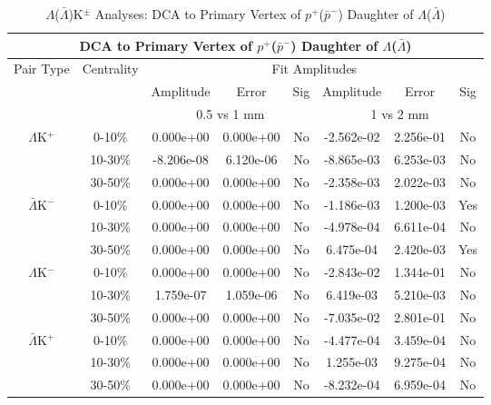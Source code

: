 \documentclass[../AnalysisNoteJBuxton.tex]{subfiles}
\begin{document}
\clearpage




\begin{table}
 \centering
 \begin{tabular}{|c|c|c|c|c||c|c|c|}
  \multicolumn{8}{c}{DCA to Primary Vertex of $p^{+}$($\bar{p}^{-}$) Daughter of $\Lambda$($\bar{\Lambda}$)} \\
  \hline
  \multirow{3}{*}{Pair Type} & \multirow{3}{*}{Centrality} & \multicolumn{6}{c|}{Fit Amplitudes} \\
  \cline{3-8}
   & & Amplitude & Error & Sig & Amplitude & Error & Sig \\  
  \cline{3-8}
   & & \multicolumn{3}{c||}{0.5 vs 1 mm} & \multicolumn{3}{c|}{1 vs 2 mm} \\  
  \hline
  \multirow{3}{*}{$\Lambda$K$^{+}$}
   &  0-10\% & 0.000e+00 & 0.000e+00 & No & -2.562e-02 & 2.256e-01 & No \\
   & 10-30\% & -8.206e-08 & 6.120e-06 & No & -8.865e-03 & 6.253e-03 & No \\
   & 30-50\% & 0.000e+00 & 0.000e+00 & No & -2.358e-03 & 2.022e-03 & No \\
  \hline
  \multirow{3}{*}{$\bar{\Lambda}$K$^{-}$}
   &  0-10\% & 0.000e+00 & 0.000e+00 & No & -1.186e-03 & 1.200e-03 & Yes \\
   & 10-30\% & 0.000e+00 & 0.000e+00 & No & -4.978e-04 & 6.611e-04 & No \\
   & 30-50\% & 0.000e+00 & 0.000e+00 & No & 6.475e-04 & 2.420e-03 & Yes \\
  \hline \hline
  \multirow{3}{*}{$\Lambda$K$^{-}$}
   &  0-10\% & 0.000e+00 & 0.000e+00 & No & -2.843e-02 & 1.344e-01 & No \\
   & 10-30\% & 1.759e-07 & 1.059e-06 & No & 6.419e-03 & 5.210e-03 & No \\
   & 30-50\% & 0.000e+00 & 0.000e+00 & No & -7.035e-02 & 2.801e-01 & No \\
  \hline
  \multirow{3}{*}{$\bar{\Lambda}$K$^{+}$}
   &  0-10\% & 0.000e+00 & 0.000e+00 & No & -4.477e-04 & 3.459e-04 & No \\
   & 10-30\% & 0.000e+00 & 0.000e+00 & No & 1.255e-03 & 9.275e-04 & No \\
   & 30-50\% & 0.000e+00 & 0.000e+00 & No & -8.232e-04 & 6.959e-04 & No \\
  \hline
 \end{tabular}
 \caption{$\Lambda$($\bar{\Lambda}$)K$^{\pm}$ Analyses: DCA to Primary Vertex of $p^{+}$($\bar{p}^{-}$) Daughter of $\Lambda$($\bar{\Lambda}$)}
 \label{tab:DcaToPrimVertexProtonDaughtOfLamLamKch}
\end{table}
\end{document}
